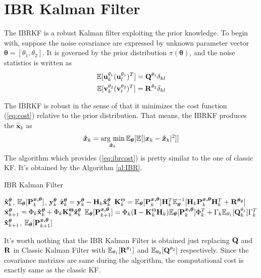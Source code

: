 \section{IBR Kalman Filter\label{sec: ibr}}

The IBRKF is a robust Kalman filter exploiting the prior knowledge. To begin with, suppose the noise covariance are expressed by unknown parameter vector $\bm{\theta}=[\theta_1, \theta_2]$. It is governed by the prior distribution $\pi(\bm{\theta})$, and the noise statistics is written as
\begin{align}
    \mathbb{E}[{\bf u}^{\theta_1}_k ({\bf u}^{\theta_1}_l)^T]={\bf Q}^{\theta_1}\delta_{kl} \\
    \mathbb{E}[{\bf v}^{\theta_2}_k ({\bf v}^{\theta_2}_l)^T]={\bf R}^{\theta_2}\delta_{kl} 
\end{align}

The IBRKF is robust in the sense of that it minimizes the cost function (\ref{eq:cost}) relative to the prior distribution. That means, the IBRKF produces the $\bm{\hat x}_k$ as
\begin{equation} \label{eq:ibrcost}
    \bm{\hat x}_k = \mathop{\rm arg~min}\limits_{\bm{\hat x}_k}\mathbb{E}_{\bm{\theta}}[\mathbb{E}[|\bm{x}_k-\bm{\hat x}_k|^2]]
\end{equation}
The algorithm which provides (\ref{eq:ibrcost}) is pretty similar to the one of classic KF. It's obtained by the Algorithm \ref{al:IBR}.

\begin{algorithm}[]
\caption{IBR Kalman Filter}
\begin{algorithmic}[1]
    \label{al:IBR}
\REQUIRE ${\bf \hat x}^{\bm{\theta}}_k$, $\mathbb{E}_{\bm{\theta}}[{\bf P}^{\bm{x, \theta}}_{k}]$, ${\bf y}^{\bm{\theta}}_k$
\STATE $\tilde {\bf z}^{\bm{\theta}}_k = {\bf y}^{\bm{\theta}}_k - {\bf H}_k{\bf \hat x}^{\bm{\theta}}_k$
\STATE ${\bf K}^{\Theta}_k = \mathbb{E}_{\bm{\theta}}[{\bf P}^{\bm{x, \theta}}_k]{\bf H}^T_k\mathbb{E}_{\bm{\theta}}^{-1}[{\bf H}_k{\bf P}^{\bm{x, \theta}}_k{\bf H}^T_k+{\bf R}^{\bm{\theta_2}}]$
\STATE $\hat{\bf x}^{\bm{\theta}}_{k+1} = {\Phi}_k{\bf \hat x}^{\bm{\theta}}_k+{\Phi}_k{\bf K}^{\bm{\Theta}}_k{\bf \tilde z}^{\bm{\theta}}_k$
\STATE $\mathbb{E}_{\bm\theta}[{\bf P}^{\bm{x, \theta}}_{k+1}] = {\Phi}_k({\bf I}-{\bf K}^{\Theta}_k{\bf H}_k)\mathbb{E}_{\bm\theta}[{\bf P}^{\bm{x, \theta}}_k]{\Phi}^T_k + {\Gamma}_k\mathbb{E}_{\theta_1}[{\bf Q}^{\theta_1}_k]{\Gamma}_k^T$
\ENSURE ${\bf \hat x}^{\bm{\theta}}_{k+1}$, $\mathbb{E}_{\bm\theta}[{\bf P}^{\bm{x, \theta}}_{k+1}]$
\end{algorithmic}
\end{algorithm}

It's worth nothing that the IBR Kalman Filter is obtained just replacing ${\bf Q}$ and ${\bf R}$ in Classic Kalman Filter with $\mathbb{E}_{\theta_1}[{\bf R}^{\theta_1}]$ and $\mathbb{E}_{\theta_2}[{\bf Q}^{\theta_2}]$ respectively. Since the covariance matrixes are same during the algorithm, the computational cost is exactly same as the classic KF. 